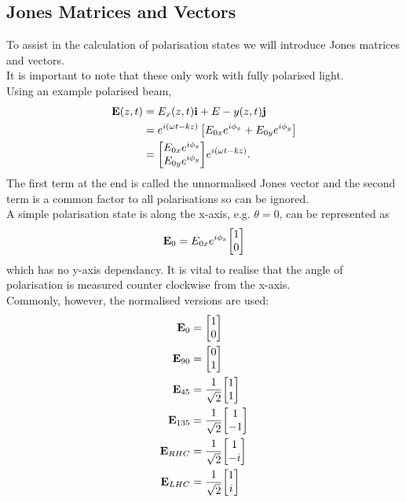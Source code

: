 \subsection{Jones Matrices and Vectors}
To assist in the calculation of polarisation states we will introduce Jones matrices and vectors. 
\\
It is important to note that these only work with fully polarised light.
\\
Using an example polarised beam,
\begin{align*}
\vb{E}(z,t) &= E_x(z,t)\vb{i} + E-y(z,t)\vb{j}\\
		&= e^{i(\omega{t} - kz)}\left[E_{0x}e^{i\phi_x} + E_{0y}e^{i\phi_y}\right]\\
		&= \mqty[E_{0x}e^{i\phi_x} \\ E_{0y}e^{i\phi_y}]e^{i(\omega{t} -kz)} .
\end{align*}
The first term at the end is called the unnormalised Jones vector and the second term is a common factor to all polarisations so can be ignored.
\\
A simple polarisation state is along the x-axis, e.g. \(\theta = 0\), can be represented as 
\[\vb{E}_0 = E_{0x}e^{i\phi_x}\mqty[1 \\ 0]\]
which has no y-axis dependancy.
It is vital to realise that the angle of polarisation is measured counter clockwise from the x-axis.
\\
Commonly, however, the normalised versions are used:
\begin{align*}
\vb{E}_0 &= \mqty[1 \\ 0]\\
\vb{E}_{90} &= \mqty[0 \\ 1]\\
\vb{E}_{45} &= \frac{1}{\sqrt{2}}\mqty[1 \\ 1]\\
\vb{E}_{135} &= \frac{1}{\sqrt{2}}\mqty[1 \\ -1]\\
\vb{E}_{RHC} &= \frac{1}{\sqrt{2}}\mqty[1 \\ -i]\\
\vb{E}_{LHC} &= \frac{1}{\sqrt{2}}\mqty[1 \\ i]\\
\end{align*}


